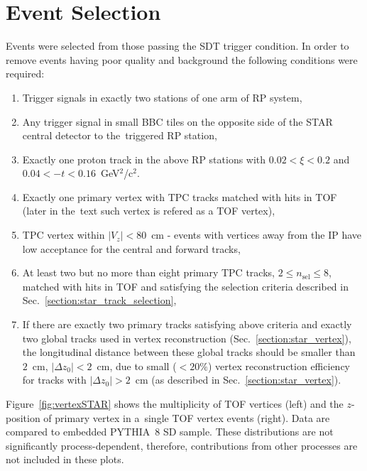 \section{Event Selection}\label{section:star_event_selection}
Events were selected from those passing the SDT trigger condition. In order to remove events having poor quality and background the following conditions were required:
\begin{enumerate}
	\item Trigger signals in exactly two stations of one arm of \ac{RP} system,
	\item Any trigger signal in small BBC tiles on the opposite side of the STAR central detector to the~triggered RP station,
	\item Exactly one proton track in the above RP stations with $0.02 < \xi < 0.2$ and $0.04 < -t < 0.16$~GeV$^{2}$/c$^{2}$. 
	\item Exactly one primary vertex with TPC tracks matched with hits in TOF (later in the~text such vertex  is refered as a TOF vertex),
	\item TPC vertex  within $|V_z|<80$~cm - events with vertices away from the IP have low acceptance for the central and forward tracks,
	\item At least two but no more than eight primary TPC tracks, $2\leq n_{\textrm{sel}}\leq 8$, matched with hits in TOF and satisfying the selection criteria described in Sec.~\ref{section:star_track_selection},
	\item If there are exactly two primary tracks satisfying above criteria and exactly two global tracks used in vertex reconstruction (Sec.~\ref{section:star_vertex}), the longitudinal distance between these global tracks should be smaller than $2$~cm, $|\Delta z_0|<2$~cm, due to small ($<20\%$) vertex reconstruction efficiency for tracks with $|\Delta z_0|>2$~cm (as described in Sec.~\ref{section:star_vertex}).
\end{enumerate}
Figure~\ref{fig:vertexSTAR} shows the multiplicity of TOF vertices (left) and the $z$-position of primary vertex in a~single TOF vertex events (right). Data are compared to embedded PYTHIA~8 SD sample. These distributions are not significantly process-dependent, therefore, contributions from other processes are not included in these plots.


